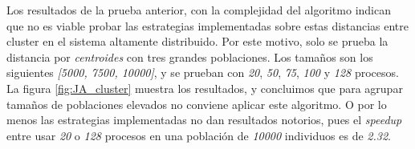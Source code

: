 			
		Los resultados de la prueba anterior, con la complejidad del algoritmo indican que no es viable probar las estrategias implementadas sobre estas distancias entre cluster en el sistema altamente distribuido. Por este motivo, solo se prueba la distancia por \textit{centroides} con tres grandes poblaciones. Los tamaños son los siguientes \textit{[5000, 7500, 10000]}, y se prueban con \textit{20}, \textit{50}, \textit{75}, \textit{100} y \textit{128} procesos. La figura \ref{fig:JA_cluster} muestra los resultados, y concluimos que para agrupar tamaños de poblaciones elevados no conviene aplicar este algoritmo. O por lo menos las estrategias implementadas no dan resultados notorios, pues el \textit{speedup} entre usar \textit{20} o \textit{128} procesos en una población de \textit{10000} individuos es de \textit{2.32}.
						
